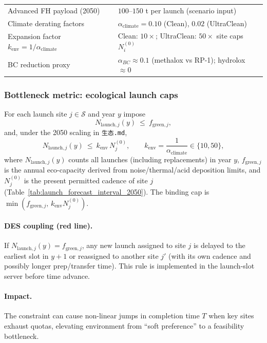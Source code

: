 ﻿\documentclass{mcmthesis}
\begin{document}
\begin{table}[htbp]
\begin{tabularx}{\textwidth}{@{}l >{\raggedright\arraybackslash}X@{}}
Advanced FH payload (2050) & $100$--$150$ t per launch (scenario input)\\
Climate derating factors & $\alpha_{\text{climate}}=0.10$ (Clean), $0.02$ (UltraClean)\\
Expansion factor $k_{\text{env}}=1/\alpha_{\text{climate}}$ & Clean: $10\times$; UltraClean: $50\times$ site caps $N_i^{(0)}$\\
BC reduction proxy & $\alpha_{BC}\approx0.1$ (methalox vs RP-1); hydrolox $\approx 0$\\
\bottomrule
\end{tabularx}
\end{table}

\subsubsection{Bottleneck metric: ecological launch caps}
For each launch site $j\in\mathcal{S}$ and year $y$ impose
\begin{equation}
N_{\text{launch},j}(y)\ \le\ f_{\text{green},j},
\end{equation}
and, under the 2050 scaling in \texttt{生态.md},
\begin{equation}
N_{\text{launch},j}(y)\ \le\ k_{\text{env}}\,N_j^{(0)},\qquad
k_{\text{env}}=\frac{1}{\alpha_{\text{climate}}}\in\{10,50\},
\end{equation}
where $N_{\text{launch},j}(y)$ counts all launches (including replacements) in year $y$, $f_{\text{green},j}$ is the annual eco-capacity derived from noise/thermal/acid deposition limits, and $N_j^{(0)}$ is the present permitted cadence of site $j$ (Table~\ref{tab:launch_forecast_interval_2050}). The binding cap is $\min(f_{\text{green},j},\,k_{\text{env}}N_j^{(0)})$.

\paragraph{DES coupling (red line).}
If $N_{\text{launch},j}(y)=f_{\text{green},j}$, any new launch assigned to site $j$ is delayed to the earliest slot in $y\!+\!1$ or reassigned to another site $j'$ (with its own cadence and possibly longer prep/transfer time). This rule is implemented in the launch-slot server before time advance.

\paragraph{Impact.}
The constraint can cause non-linear jumps in completion time $T$ when key sites exhaust quotas, elevating environment from “soft preference” to a feasibility bottleneck.
\end{document}
